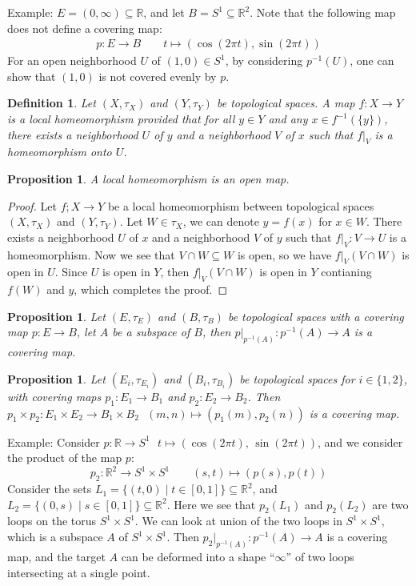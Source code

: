 \documentclass[11pt]{book}
\theoremstyle{break}
\theoremstyle{break}
\newtheorem{prop}[lem]{Proposition}
\newtheorem{defn}{Definition}[corL]
\newcommand{\R}{\mathbb{R}}
\newcommand{\example}{\color{green}Example: \color{black}}
\begin{document}
\example $E = (0,\infty) \subseteq \R$, and let $B =S^1\subseteq \R^2$. Note that the following map does not define a covering map:
\begin{align*}
p:E \to B \qquad t\mapsto (\cos(2\pi t), \sin(2\pi t))
\end{align*}
For an open neighborhood $U$ of $(1,0) \in S^1$, by considering $p^{-1}(U)$, one can show that $(1,0)$ is not covered evenly by $p$.\\


\begin{defn}
Let $(X,\tau_X)$ and $(Y,\tau_Y)$ be topological spaces. A map $f:X \to Y$ is a local homeomorphism provided that for all $y \in Y$ and any $x \in f^{-1}(\{y\})$, there exists a neighborhood $U$ of $y$ and a neighborhood $V$ of $x$ such that $f|_V$ is a homeomorphism onto $U$.  
\end{defn}


\begin{prop}
A local homeomorphism is an open map. 
\end{prop}
\begin{proof}
Let $f;X \to Y$ be a local homeomorphism between topological spaces $(X,\tau_X)$ and $(Y,\tau_Y)$. Let $W \in \tau_X$, we can denote $y = f(x)$ for $x \in W$. There exists a neighborhood $U$ of $x$ and a neighborhood $V$ of $y$ such that $f|_V: V\to U$ is a homeomorphism. Now we see that $V\cap W \subseteq W$ is open, so we have $f|_V(V\cap W)$ is open in $U$.  Since $U$ is open in $Y$, then $f|_V(V\cap W)$ is open in $Y$ contianing $f(W)$ and $y$, which completes the proof.  
\end{proof}

\begin{prop}
Let $(E,\tau_E)$ and $(B,\tau_B)$ be topological spaces with a covering map $p:E \to B$, let $A$ be a subspace of $B$, then $p|_{p^{-1}(A)}: p^{-1}(A) \to A$ is a covering map. 
\end{prop}


\begin{prop}
Let $(E_i,\tau_{E_i})$ and $(B_i,\tau_{B_i})$ be topological spaces for $i \in \{1,2\}$, with covering maps $p_1:E_1 \to B_1$ and $p_2:E_2 \to B_2$. Then $p_1 \times p_2 : E_1 \times E_2 \to B_1 \times B_2 \ \ \ (m,n)\mapsto (p_1(m),p_2(n))$ is a covering map. 
\end{prop}



\example Consider $p:\R \to S^1 \ \ \ t\mapsto (\cos(2\pi t) ,\, \sin(2\pi t))$, and we consider the product of the map $p$: 
$$p_2 :\R^2 \to S^1 \times S^1 \qquad (s,t) \mapsto (p(s), p(t))$$
Consider the sets $L_1 = \{(t,0) \mid t \in [0,1]\} \subseteq \R^2$, and $L_2 = \{(0,s) \mid s \in [0,1]\} \subseteq \R^2$. Here we see that $p_2(L_1)$ and $p_2(L_2)$ are two loops on the torus $S^1 \times S^1$. We can look at union of the two loops in $S^1 \times S^1$, which is a subspace $A$ of $S^1 \times S^1$. Then $p_2|_{p^{-1}(A)}: p^{-1}(A) \to A$ is a covering map, and the target $A$ can be deformed into a shape ``$\infty$'' of two loops intersecting at a single point. 
\end{document}
